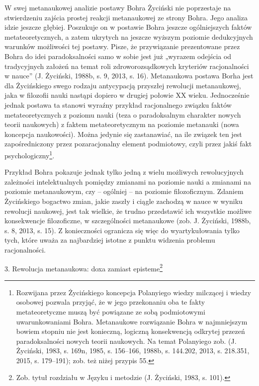 \documentclass{article}
\begin{document}
W swej metanaukowej analizie postawy Bohra Życiński nie poprzestaje na stwierdzeniu zajścia prostej reakcji metanaukowej
ze strony Bohra. Jego analiza idzie jeszcze głębiej. Poszukuje on w postawie Bohra jeszcze ogólniejszych faktów
metateoretycznych, a zatem ukrytych na jeszcze wyższym poziomie dedukcyjnych warunków możliwości tej postawy. Pisze, że
przywiązanie prezentowane przez Bohra do idei paradoksalności samo w sobie jest już „wyrazem odejścia od tradycyjnych
założeń na temat roli zdroworozsądkowych kryteriów racjonalności w nauce” \label{ref:RND7AT9mZ6IoG}(J. Życiński, 1988b,
s. 9, 2013, s. 16). Metanaukowa postawa Borha jest dla Życińskiego swego rodzaju antycypacją przyszłej rewolucji
metanaukowej, jaka w filozofii nauki nastąpi dopiero w drugiej połowie XX wieku. Jednocześnie jednak postawa ta stanowi
wyraźny przykład racjonalnego związku faktów metateoretycznych z poziomu nauki (teza o paradoksalnym charakter nowych
teorii naukowych) z faktem metateoretycznym na poziomie metanauki (nowa koncepcja naukowości). Można jedynie się
zastanawiać, na ile związek ten jest zapośredniczony przez pozaracjonalny element podmiotowy, czyli przez jakiś fakt
psychologiczny\footnote{Rozwijana przez Życińskiego koncepcja Polanyiego wiedzy milczącej i wiedzy osobowej pozwala
przyjąć, że w jego przekonaniu oba te fakty metateoretyczne muszą być powiązane ze sobą podmiotowymi uwarunkowaniami
Bohra. Metanaukowe rozwiązanie Bohra w najmniejszym bowiem stopniu nie jest konieczną, logiczną konsekwencją odkrytej
przezeń paradoksalności nowych teorii naukowych. Na temat Polanyiego zob. \label{ref:RNDgm9vg5CtBx}(J. Życiński, 1983,
s. 169n, 1985, s. 156–166, 1988b, s. 144.202, 2013, s. 218.351, 2015, s. 179–191); zob. też niżej przypis 55.}.

Przykład Bohra pokazuje jednak tylko jedną z wielu możliwych rewolucyjnych zależności intelektualnych pomiędzy zmianami
na poziomie nauki a zmianami na poziomie metanaukowym, czy – ogólniej – na poziomie filozoficznym. Zdaniem Życińskiego
bogactwo zmian, jakie zaszły i ciągle zachodzą w nauce w wyniku rewolucji naukowej, jest tak wielkie, że trudno
przedstawić ich wszystkie możliwe konsekwencje filozoficzne, w szczególności metanaukowe \label{ref:RNDJXAyHhUuS3}(zob.
J. Życiński, 1988b, s. 8, 2013, s. 15). Z konieczności ogranicza się więc do wyartykułowania tylko tych, które uważa za
najbardziej istotne z punktu widzenia problemu racjonalności.

3. Rewolucja metanaukowa: doxa zamiast episteme\footnote{Zob. tytuł rozdziału w Języku i metodzie
\label{ref:RNDDNOb8iCJVi}(J. Życiński, 1983, s. 101).}
\end{document}
